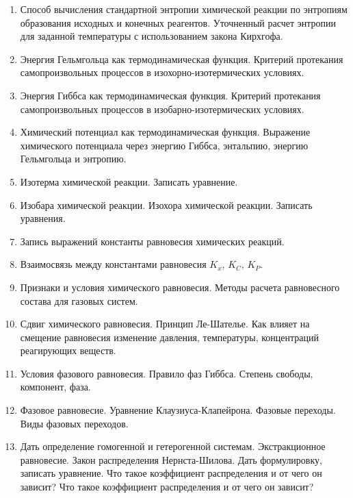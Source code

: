 \begin{enumerate}
\item 
Способ вычисления стандартной энтропии химической реакции по энтропиям образования исходных и конечных реагентов. Уточненный расчет энтропии для заданной температуры с использованием закона Кирхгофа.
 
\item 
Энергия Гельмгольца как термодинамическая функция. Критерий протекания самопроизвольных процессов в изохорно-изотермических условиях.
 
\item 
Энергия Гиббса как термодинамическая функция. Критерий протекания самопроизвольных процессов в изобарно-изотермических условиях.
 
\item 
Химический потенциал как термодинамическая функция. Выражение химического потенциала через энергию Гиббса, энтальпию,  энергию Гельмгольца и энтропию.
 
\item 
Изотерма химической реакции. Записать уравнение.
 
\item 
Изобара химической реакции. Изохора химической реакции. Записать уравнения.
 
\item 
Запись выражений константы равновесия химических реакций.
 
\item 
Взаимосвязь между константами равновесия $K_{x}$, $K_{C}$, $K_{P}$.
 
\item 
Признаки и условия химического равновесия. Методы расчета равновесного состава для газовых систем.
 
\item 
Сдвиг химического равновесия. Принцип Ле-Шателье. Как влияет на смещение равновесия изменение давления, температуры, концентраций реагирующих веществ.
 
\item 
Условия фазового равновесия. Правило фаз Гиббса. Степень свободы, компонент, фаза.
 
\item 
Фазовое равновесие. Уравнение Клаузиуса-Клапейрона. Фазовые переходы. Виды фазовых переходов. 
 
\item 
Дать определение гомогенной и гетерогенной системам. 
Экстракционное равновесие. Закон распределения Нернста-Шилова. Дать формулировку, записать уравнение. Что такое коэффициент распределения и от чего он зависит? Что такое коэффициент распределения и от чего он зависит?
 
\end{enumerate}